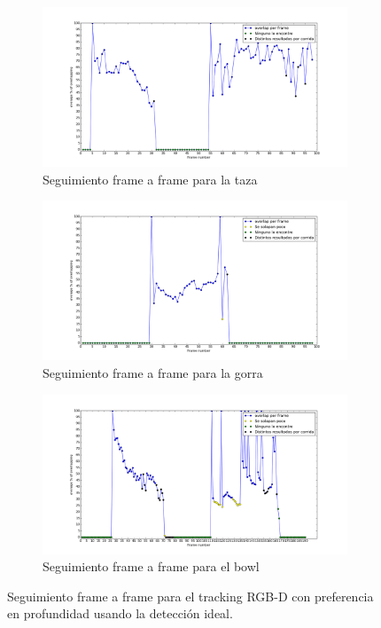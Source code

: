 \begin{figure}
	\centering
	\begin{subfigure}[b]{0.9\textwidth}
		\includegraphics[width=\textwidth]{img/frame_a_frame/rgbd-d-taza.png}
		\caption{Seguimiento frame a frame para la taza}
		\label{frame_frame_rgbd_d_taza}
	\end{subfigure}
	\quad
	\begin{subfigure}[b]{0.9\textwidth}
		\includegraphics[width=\textwidth]{img/frame_a_frame/rgbd-d-gorra.png}
		\caption{Seguimiento frame a frame para la gorra}
		\label{frame_frame_rgbd_d_gorra}
	\end{subfigure}
	\quad
	\begin{subfigure}[b]{0.9\textwidth}
		\includegraphics[width=\textwidth]{img/frame_a_frame/rgbd-d-bowl.png}
		\caption{Seguimiento frame a frame para el bowl}
		\label{frame_frame_rgbd_d_bowl}
	\end{subfigure}
	\caption{Seguimiento frame a frame para el tracking RGB-D con preferencia en profundidad usando la detección ideal.}
	\label{frame_frame_rgbd_d}
\end{figure}


